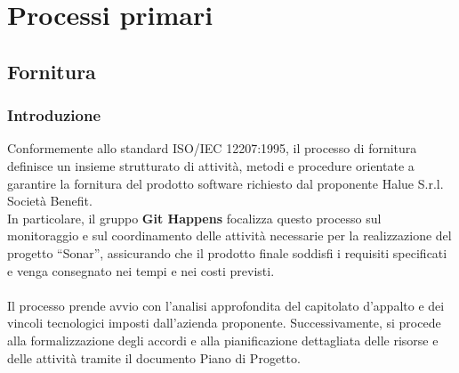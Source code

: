 \section{Processi primari}

\subsection{Fornitura}

\subsubsection{Introduzione}
Conformemente allo standard ISO/IEC 12207:1995, il processo di fornitura definisce un insieme strutturato di attività, metodi e procedure orientate a garantire la fornitura del prodotto software richiesto dal proponente Halue S.r.l. Società Benefit. \\
In particolare, il gruppo \textbf{Git Happens} focalizza questo processo sul monitoraggio e sul coordinamento delle attività necessarie per la realizzazione del progetto ``Sonar'', assicurando che il prodotto finale soddisfi i requisiti specificati e venga consegnato nei tempi e nei costi previsti.
\\ \\
Il processo prende avvio con l'analisi approfondita del capitolato d'appalto e dei vincoli tecnologici imposti dall'azienda proponente. Successivamente, si procede alla formalizzazione degli accordi e alla pianificazione dettagliata delle risorse e delle attività tramite il documento Piano di Progetto.

